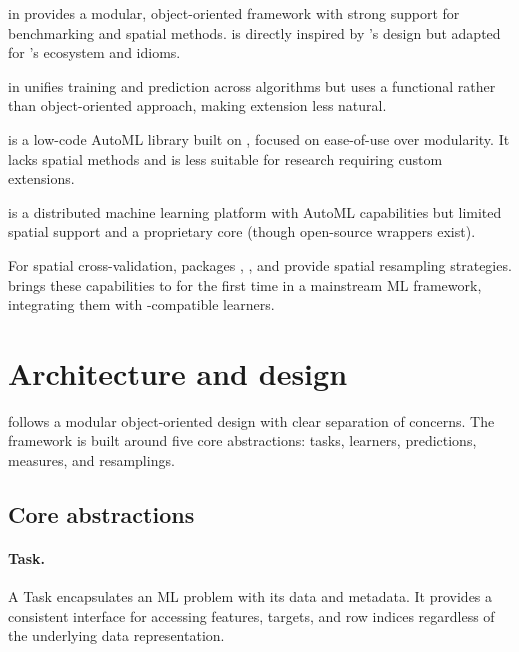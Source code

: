 \documentclass[article]{jss}
\begin{document}
\textbf{} \citep{lang2019mlr3} in  provides a modular, object-oriented framework with strong support for benchmarking and spatial methods.  is directly inspired by 's design but adapted for 's ecosystem and idioms.

\textbf{} \citep{kuhn2008caret} in  unifies training and prediction across algorithms but uses a functional rather than object-oriented approach, making extension less natural.

\textbf{} is a low-code AutoML library built on , focused on ease-of-use over modularity. It lacks spatial methods and is less suitable for research requiring custom extensions.

\textbf{} \citep{h2o} is a distributed machine learning platform with AutoML capabilities but limited spatial support and a proprietary core (though open-source wrappers exist).

For spatial cross-validation,  packages  \citep{valavi2019blockCV},  \citep{brenning2012sperrorest}, and  \citep{meyer2018CAST} provide spatial resampling strategies.  brings these capabilities to  for the first time in a mainstream ML framework, integrating them with -compatible learners.



\section{Architecture and design} \label{sec:architecture}

 follows a modular object-oriented design with clear separation of concerns. The framework is built around five core abstractions: tasks, learners, predictions, measures, and resamplings.

\subsection{Core abstractions}

\paragraph{Task.}
A Task encapsulates an ML problem with its data and metadata. It provides a consistent interface for accessing features, targets, and row indices regardless of the underlying data representation.
\end{document}
